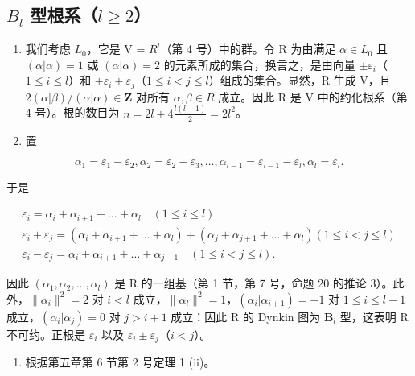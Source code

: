 \subsection{\texorpdfstring{\(B_{l}\) 型根系（\(l \geqslant 2\)）}{B\_l 型根系 (l >= 2)}}

\begin{enumerate}
\def\labelenumi{(\Roman{enumi})}
\item
  我们考虑 \(L_{0}\)，它是 V = \(R^{l}\)（第 4 号）中的群。令 R 为由满足 \(\alpha \in L_{0}\) 且 \((\alpha|\alpha) = 1\) 或 \((\alpha|\alpha) = 2\) 的元素所成的集合，换言之，是由向量 \(\pm\varepsilon_{i}\)（\(1 \leqslant i \leqslant l\)）和 \(\pm\varepsilon_{i} \pm \varepsilon_{j}\)（\(1 \leqslant i < j \leqslant l\)）组成的集合。显然，R 生成 V，且 \(2(\alpha|\beta)/(\alpha|\alpha) \in \mathbf{Z}\) 对所有 \(\alpha, \beta \in R\) 成立。因此 R 是 V 中的约化根系（第 4 号）。根的数目为 \(n = 2l + 4\frac{l(l-1)}{2} = 2l^{2}\)。
\item
  置
\end{enumerate}

\[
\alpha_ {1} = \varepsilon_ {1} - \varepsilon_ {2}, \alpha_ {2} = \varepsilon_ {2} - \varepsilon_ {3}, \dots , \alpha_ {l - 1} = \varepsilon_ {l - 1} - \varepsilon_ {l}, \alpha_ {l} = \varepsilon_ {l}.
\]

于是

\[
\begin{array}{c} \varepsilon_ {i} = \alpha_ {i} + \alpha_ {i + 1} + \dots + \alpha_ {l} \quad (1 \leqslant i \leqslant l) \\ \varepsilon_ {i} + \varepsilon_ {j} = (\alpha_ {i} + \alpha_ {i + 1} + \dots + \alpha_ {l}) + (\alpha_ {j} + \alpha_ {j + 1} + \dots + \alpha_ {l}) (1 \leqslant i <   j \leqslant l) \\ \varepsilon_ {i} - \varepsilon_ {j} = \alpha_ {i} + \alpha_ {i + 1} + \dots + \alpha_ {j - 1} \quad (1 \leqslant i <   j \leqslant l). \end{array}
\]

因此 \((\alpha_{1},\alpha_{2},\ldots ,\alpha_{l})\) 是 R 的一组基（第 1 节，第 7 号，命题 20 的推论 3）。此外，\(\| \alpha_{i}\|^{2} = 2\) 对 \(i < l\) 成立，\(\| \alpha_l\| ^2 = 1\)，\((\alpha_i|\alpha_{i + 1}) = -1\) 对 \(1\leqslant i\leqslant l - 1\) 成立，\((\alpha_i|\alpha_j) = 0\) 对 \(j > i + 1\) 成立：因此 R 的 Dynkin 图为 \(\mathbf{B}_l\) 型，这表明 R 不可约。正根是 \(\varepsilon_{i}\) 以及 \(\varepsilon_{i}\pm \varepsilon_{j}\)（\(i < j\)）。

\begin{enumerate}
\def\labelenumi{(\Roman{enumi})}
\setcounter{enumi}{2}
\tightlist
\item
  根据第五章第 6 节第 2 号定理 1 (ii)。
\end{enumerate}

